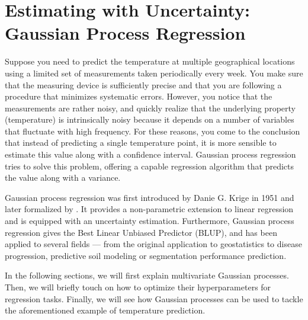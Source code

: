 
\section{Estimating with Uncertainty: Gaussian Process Regression}\label{sec:gaussian_process_background}
Suppose you need to predict the temperature at multiple geographical locations using a limited set of measurements taken periodically every week. You make sure that the measuring device is sufficiently precise and that you are following a procedure that minimizes systematic errors. However, you notice that the measurements are rather noisy, and quickly realize that the underlying property (temperature) is intrinsically noisy because it depends on a number of variables that fluctuate with high frequency. For these reasons, you come to the conclusion that instead of predicting a single temperature point, it is more sensible to estimate this value along with a confidence interval. Gaussian process regression tries to solve this problem, offering a capable regression algorithm that predicts the value along with a variance.

Gaussian process regression was first introduced by Danie G. Krige in 1951 and later formalized by . It provides a non-parametric extension to linear regression and is equipped with an uncertainty estimation. Furthermore, Gaussian process regression gives the Best Linear Unbiased Predictor (BLUP), and has been applied to several fields --- from the original application to geostatistics to disease progression, predictive soil modeling or segmentation performance prediction.

In the following sections, we will first explain multivariate Gaussian processes. Then, we will briefly touch on how to optimize their hyperparameters for regression tasks. Finally, we will see how Gaussian processes can be used to tackle the aforementioned example of temperature prediction.




